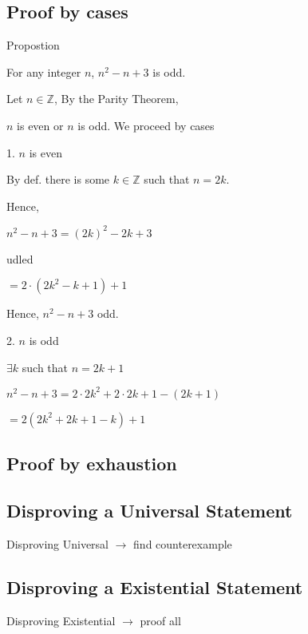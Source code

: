 \documentclass[a4paper,11pt]{article}
\begin{document}
\subsection{Proof by cases}

Propostion

For any integer $n$, $n^2 - n + 3$ is odd.


Let $n \in \mathbb{Z}$, By the Parity Theorem,

$n$ is even or $n$ is odd. We proceed by cases

1. $n$ is even


By def. there is some $k \in \mathbb{Z}$ such that $n = 2k$.


Hence,


$n^2 - n + 3 = (2k)^2 - 2k + 3$


udled


$= 2 \cdot (2k^2 - k + 1) + 1$

Hence, $n^2 - n + 3$ odd.

2. $n$ is odd

$\exists k$ such that $n = 2k + 1$

$n^2 - n + 3 = 2 \cdot 2k^2 + 2 \cdot 2k + 1 - (2k + 1)$

$= 2 (2k^2 + 2k + 1 - k) + 1$

\subsection{Proof by exhaustion}

\subsection{Disproving a Universal Statement}

Disproving Universal $\to$ find counterexample

\subsection{Disproving a Existential Statement}

Disproving Existential $\to$ proof all
\end{document}
